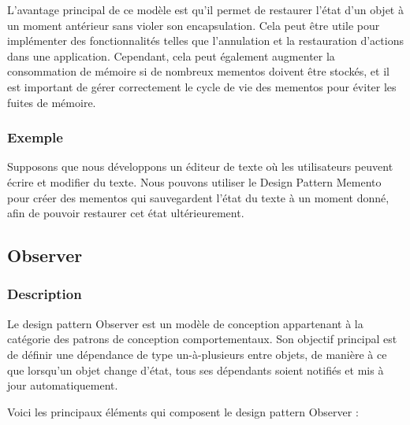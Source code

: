 L'avantage principal de ce modèle est qu'il permet de restaurer l'état d'un objet à un moment antérieur sans violer son encapsulation. Cela peut être utile pour implémenter des fonctionnalités telles que l'annulation et la restauration d'actions dans une application. Cependant, cela peut également augmenter la consommation de mémoire si de nombreux mementos doivent être stockés, et il est important de gérer correctement le cycle de vie des mementos pour éviter les fuites de mémoire.


\subsubsection{Exemple}

Supposons que nous développons un éditeur de texte où les utilisateurs peuvent écrire et modifier du texte. Nous pouvons utiliser le Design Pattern Memento pour créer des mementos qui sauvegardent l'état du texte à un moment donné, afin de pouvoir restaurer cet état ultérieurement.




\newpage

\subsection{Observer}

\subsubsection{Description}

Le design pattern Observer est un modèle de conception appartenant à la catégorie des patrons de conception comportementaux. Son objectif principal est de définir une dépendance de type un-à-plusieurs entre objets, de manière à ce que lorsqu'un objet change d'état, tous ses dépendants soient notifiés et mis à jour automatiquement.

Voici les principaux éléments qui composent le design pattern Observer :

